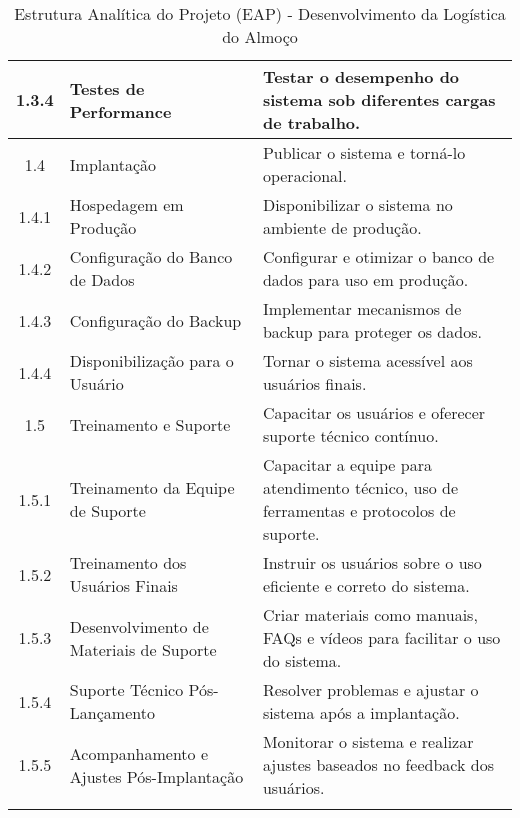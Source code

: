 \documentclass{article}
\begin{document}
\begin{longtable}{|c|l|p{10cm}|}
1.3.4 & Testes de Performance & Testar o desempenho do sistema sob diferentes cargas de trabalho. \\ \hline
1.4 & Implantação & Publicar o sistema e torná-lo operacional. \\ \hline
1.4.1 & Hospedagem em Produção & Disponibilizar o sistema no ambiente de produção. \\ \hline
1.4.2 & Configuração do Banco de Dados & Configurar e otimizar o banco de dados para uso em produção. \\ \hline
1.4.3 & Configuração do Backup & Implementar mecanismos de backup para proteger os dados. \\ \hline
1.4.4 & Disponibilização para o Usuário & Tornar o sistema acessível aos usuários finais. \\ \hline
1.5 & Treinamento e Suporte & Capacitar os usuários e oferecer suporte técnico contínuo. \\ \hline
1.5.1 & Treinamento da Equipe de Suporte & Capacitar a equipe para atendimento técnico, uso de ferramentas e protocolos de suporte. \\ \hline
1.5.2 & Treinamento dos Usuários Finais & Instruir os usuários sobre o uso eficiente e correto do sistema. \\ \hline
1.5.3 & Desenvolvimento de Materiais de Suporte & Criar materiais como manuais, FAQs e vídeos para facilitar o uso do sistema. \\ \hline
1.5.4 & Suporte Técnico Pós-Lançamento & Resolver problemas e ajustar o sistema após a implantação. \\ \hline
1.5.5 & Acompanhamento e Ajustes Pós-Implantação & Monitorar o sistema e realizar ajustes baseados no feedback dos usuários. \\ \hline
\caption{Estrutura Analítica do Projeto (EAP) - Desenvolvimento da Logística do Almoço} \label{tab:eap-logistica-almoco} \\
\end{longtable}
\end{document}
